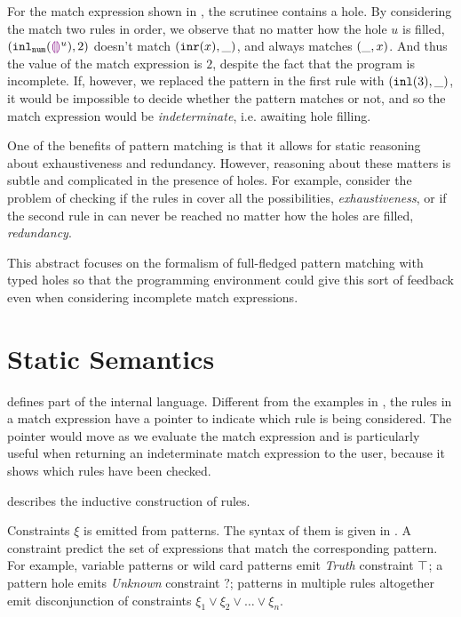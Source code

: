\documentclass[acmsmall,screen,review,nonacm]{acmart}
\theoremstyle{slplain}
\numberwithin{thm}{section}
\begin{document}
For the match expression shown in , the scrutinee contains a hole.
By considering the match two rules in order, we observe that
no matter how the hole $u$ is filled, $(\mathtt{inl}_{\mathtt{num}}({\textcolor{violet}{\llparenthesis}\textcolor{violet}{\rrparenthesis}^{u}}) , 2)$ doesn't match $(\mathtt{inr}(x) , \_)$,
and always matches $(\_ , x)$. And thus the value of the match expression is $2$, despite the fact that the program is incomplete.
If, however, we replaced the pattern in the first rule with $(\mathtt{inl}(3), \_)$, it would be impossible to decide whether the pattern matches
or not, and so the match expression would be \emph{indeterminate}, i.e. awaiting hole filling.

One of the benefits of pattern matching is that it allows for static reasoning about exhaustiveness and redundancy.
However, reasoning about these matters is subtle and complicated in the presence of holes. 
For example, consider the problem of checking if the rules in  cover all the possibilities, \ie \emph{exhaustiveness}, or if the second rule in  can never be reached no matter how the holes are filled, \ie \emph{redundancy}. 

This abstract focuses on the formalism of full-fledged pattern matching with typed holes so that the programming environment could give this sort of feedback even when considering incomplete match expressions.

\section{Static Semantics}
\label{sec:statics}



 defines part of the internal language.
Different from the examples in , the rules in a match expression have a pointer to indicate which rule is being considered.
The pointer would move as we evaluate the match expression and 
is particularly useful when returning an indeterminate match expression to the user, because it shows which rules have been checked.



 describes the inductive construction of rules. 

Constraints $\xi$ is emitted from patterns. The syntax of them is given in . A constraint predict the set of expressions that match the corresponding pattern.
For example, variable patterns or wild card patterns emit \emph{Truth} constraint $\top$;
a pattern hole emits \emph{Unknown} constraint $?$;
patterns in multiple rules altogether emit disconjunction of constraints $\xi_1 \vee \xi_2 \vee \dots \vee \xi_n$.
\end{document}
